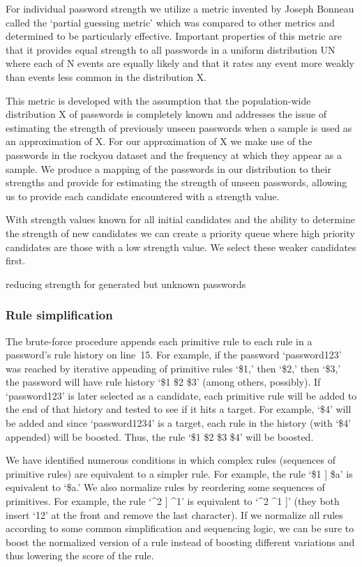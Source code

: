 \documentclass[letterpaper,twocolumn,10pt]{article}
\begin{document}
For individual password strength we utilize a metric invented by Joseph Bonneau called
the `partial guessing metric' which was compared to other metrics and determined
to be particularly effective. Important properties of this metric are that it provides
equal strength to all passwords in a uniform distribution UN where each of N events
are equally likely and that it rates any event more weakly than events less common in
the distribution X. 

This metric is developed with the assumption that the
population-wide distribution X of passwords is completely known and addresses the issue
of estimating the strength of previously unseen passwords when a sample is used as an approximation
of X. For our approximation of X we make use of the passwords in the rockyou dataset and the
frequency at which they appear as a sample. We produce a mapping of the passwords in our distribution
to their strengths and provide for estimating the strength of unseen passwords, allowing us
to provide each candidate encountered with a strength value.

With strength values known for all initial candidates and the ability to determine the strength
of new candidates we can create a priority queue where high priority candidates are those
with a low strength value. We select these weaker candidates first.


\cite{bonneau2012statistical}

reducing strength for generated but unknown passwords


\subsubsection{Rule simplification}

The brute-force procedure appends each primitive rule to each rule in a
password's rule history on line~15. For example, if the password `password123'
was reached by iterative appending of primitive rules `\$1,' then `\$2,' then
`\$3,' the password will have rule history `\$1 \$2 \$3' (among others,
possibly). If `password123' is later selected as a candidate, each primitive
rule will be added to the end of that history and tested to see if it hits a
target. For example, `\$4' will be added and since `password1234' is a target,
each rule in the history (with `\$4' appended) will be boosted. Thus, the rule
`\$1 \$2 \$3 \$4' will be boosted.

We have identified numerous conditions in which complex rules (sequences of
primitive rules) are equivalent to a simpler rule. For example, the rule `\$1 ]
\$a' is equivalent to `\$a.' We also normalize rules by reordering some
sequences of primitives. For example, the rule `\^{}2 ] \^{}1' is equivalent to
`\^{}2 \^{}1 ]' (they both insert `12' at the front and remove the last
character). If we normalize all rules according to some common simplification
and sequencing logic, we can be sure to boost the normalized version of a rule
instead of boosting different variations and thus lowering the score of the
rule.
\end{document}
